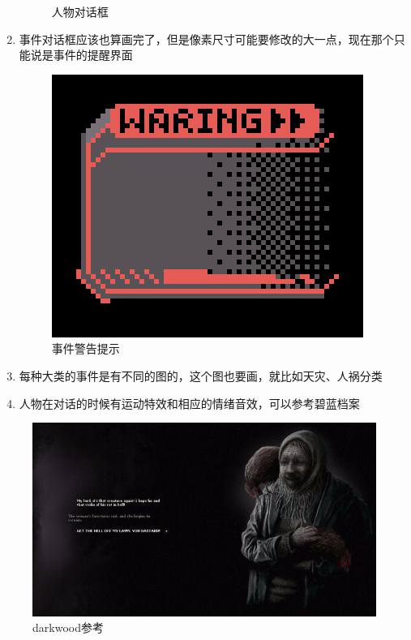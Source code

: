 \documentclass{ctexart}
\begin{document}
\begin{enumerate}
\begin{figure}[H]
				\caption{人物对话框}
				\label{人物对话框}
				\end{figure}
				\item 事件对话框应该也算画完了，但是像素尺寸可能要修改的大一点，现在那个只能说是事件的提醒界面
				\begin{figure}[H]
				\centering
				\includegraphics[scale=0.4]{material/hud2.png}
				\caption{事件警告提示}
				\label{事件警告提示}
				\end{figure}

				\item 每种大类的事件是有不同的图的，这个图也要画，就比如天灾、人祸分类
				\item 人物在对话的时候有运动特效和相应的情绪音效，可以参考碧蓝档案
			\end{enumerate}
			\begin{figure}[H]
			\centering
			\includegraphics[scale=0.4]{material/美术参考人物1.jpeg}
			\caption{darkwood参考}
			\label{darkwood参考}
			\end{figure}
\end{document}
